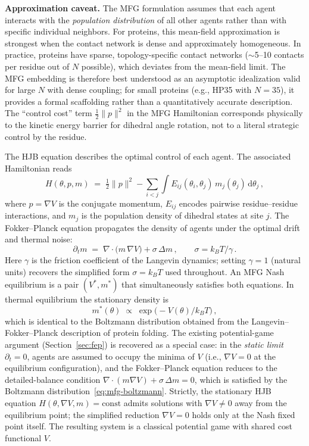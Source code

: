 \documentclass[12pt,a4paper]{article}
\theoremstyle{remark}
\begin{document}
\textbf{Approximation caveat.} The MFG formulation assumes that each agent interacts with the \emph{population distribution} of all other agents rather than with specific individual neighbors. For proteins, this mean-field approximation is strongest when the contact network is dense and approximately homogeneous. In practice, proteins have sparse, topology-specific contact networks ($\sim$5--10 contacts per residue out of $N$ possible), which deviates from the mean-field limit. The MFG embedding is therefore best understood as an asymptotic idealization valid for large $N$ with dense coupling; for small proteins (e.g., HP35 with $N=35$), it provides a formal scaffolding rather than a quantitatively accurate description. The ``control cost'' term $\frac{1}{2}\|p\|^2$ in the MFG Hamiltonian corresponds physically to the kinetic energy barrier for dihedral angle rotation, not to a literal strategic control by the residue.

The HJB equation describes the optimal control of each agent. The associated Hamiltonian reads
\begin{equation}\label{eq:mfg-hamiltonian}
  H(\theta,p,m) \;=\; \tfrac{1}{2}\|p\|^{2}
    - \sum_{i<j}\int E_{ij}(\theta_i,\theta_j)\,m_j(\theta_j)\,\mathrm{d}\theta_j\,,
\end{equation}
where $p=\nabla V$ is the conjugate momentum, $E_{ij}$ encodes pairwise residue--residue interactions, and $m_j$ is the population density of dihedral states at site $j$. The Fokker--Planck equation propagates the density of agents under the optimal drift and thermal noise:
\begin{equation}\label{eq:mfg-fp}
  \partial_t m \;=\; \nabla\!\cdot\!\bigl(m\,\nabla V\bigr) + \sigma\,\Delta m\,,
  \qquad \sigma = k_B T / \gamma\,.
\end{equation}
Here $\gamma$ is the friction coefficient of the Langevin dynamics; setting $\gamma = 1$ (natural units) recovers the simplified form $\sigma = k_B T$ used throughout.
An MFG Nash equilibrium is a pair $(V^{*},m^{*})$ that simultaneously satisfies both equations. In thermal equilibrium the stationary density is
\begin{equation}\label{eq:mfg-boltzmann}
  m^{*}(\theta) \;\propto\; \exp\!\bigl(-V(\theta)/k_B T\bigr)\,,
\end{equation}
which is identical to the Boltzmann distribution obtained from the Langevin--Fokker--Planck description of protein folding. The existing potential-game argument (Section~\ref{sec:fep}) is recovered as a special case: in the \emph{static limit} $\partial_t=0$, agents are assumed to occupy the minima of $V$ (i.e., $\nabla V=0$ at the equilibrium configuration), and the Fokker--Planck equation reduces to the detailed-balance condition $\nabla\!\cdot(m\nabla V)+ \sigma\,\Delta m=0$, which is satisfied by the Boltzmann distribution~\eqref{eq:mfg-boltzmann}. Strictly, the stationary HJB equation $H(\theta,\nabla V,m)=\text{const}$ admits solutions with $\nabla V\neq 0$ away from the equilibrium point; the simplified reduction $\nabla V=0$ holds only at the Nash fixed point itself. The resulting system is a classical potential game with shared cost functional $V$.
\end{document}

